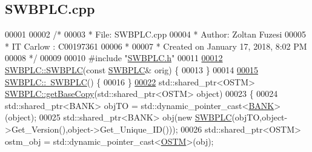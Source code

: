 \hypertarget{_s_w_b_p_l_c_8cpp_source}{}\subsection{S\+W\+B\+P\+L\+C.\+cpp}

\begin{DoxyCode}
00001 
00002 \textcolor{comment}{/* }
00003 \textcolor{comment}{ * File:   SWBPLC.cpp}
00004 \textcolor{comment}{ * Author: Zoltan Fuzesi}
00005 \textcolor{comment}{ * IT Carlow : C00197361}
00006 \textcolor{comment}{ *}
00007 \textcolor{comment}{ * Created on January 17, 2018, 8:02 PM}
00008 \textcolor{comment}{ */}
00009 
00010 \textcolor{preprocessor}{#include "\hyperlink{_s_w_b_p_l_c_8h}{SWBPLC.h}"}
00011 
\hypertarget{_s_w_b_p_l_c_8cpp_source.tex_l00012}{}\hyperlink{class_s_w_b_p_l_c_a767c6ae2b15f523b5ec6e35e137dcc96_a767c6ae2b15f523b5ec6e35e137dcc96}{00012} \hyperlink{class_s_w_b_p_l_c_a320f4e2b023038668d941ce5d0c46aeb_a320f4e2b023038668d941ce5d0c46aeb}{SWBPLC::SWBPLC}(\textcolor{keyword}{const} \hyperlink{class_s_w_b_p_l_c}{SWBPLC}& orig) \{
00013 \}
00014 
\hypertarget{_s_w_b_p_l_c_8cpp_source.tex_l00015}{}\hyperlink{class_s_w_b_p_l_c_a5d6f00a76145f32424ff6db9ac23c6fe_a5d6f00a76145f32424ff6db9ac23c6fe}{00015} \hyperlink{class_s_w_b_p_l_c_a5d6f00a76145f32424ff6db9ac23c6fe_a5d6f00a76145f32424ff6db9ac23c6fe}{SWBPLC::~SWBPLC}() \{
00016 \}
\hypertarget{_s_w_b_p_l_c_8cpp_source.tex_l00022}{}\hyperlink{class_s_w_b_p_l_c_a77f0e0d6c08a95066d277bf6b2073a5c_a77f0e0d6c08a95066d277bf6b2073a5c}{00022} std::shared\_ptr<OSTM> \hyperlink{class_s_w_b_p_l_c_a77f0e0d6c08a95066d277bf6b2073a5c_a77f0e0d6c08a95066d277bf6b2073a5c}{SWBPLC::getBaseCopy}(std::shared\_ptr<OSTM> \textcolor{keywordtype}{object})
00023 \{
00024     std::shared\_ptr<BANK> objTO = std::dynamic\_pointer\_cast<\hyperlink{class_b_a_n_k}{BANK}>(object);
00025     std::shared\_ptr<BANK> obj(\textcolor{keyword}{new} \hyperlink{class_s_w_b_p_l_c_a320f4e2b023038668d941ce5d0c46aeb_a320f4e2b023038668d941ce5d0c46aeb}{SWBPLC}(objTO,object->Get\_Version(),\textcolor{keywordtype}{object}->Get\_Unique\_ID())); 
00026     std::shared\_ptr<OSTM> ostm\_obj = std::dynamic\_pointer\_cast<\hyperlink{class_o_s_t_m}{OSTM}>(obj);                             
           

\end{DoxyCode}
